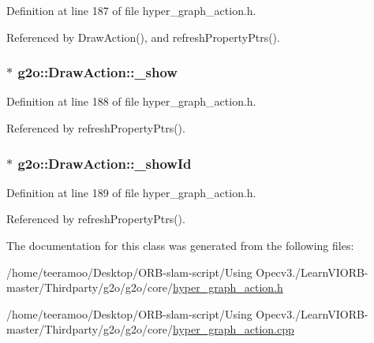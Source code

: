 Definition at line 187 of file hyper\+\_\+graph\+\_\+action.\+h.



Referenced by Draw\+Action(), and refresh\+Property\+Ptrs().

\subsubsection[{\texorpdfstring{\+\_\+show}{_show}}]{$\ast$ g2o\+::\+Draw\+Action\+::\+\_\+show\hspace{0.3cm}{\ttfamily [protected]}}\hypertarget{classg2o_1_1DrawAction_a1ec3a46473daeb8ac65e6a523a9248b6}{}\label{classg2o_1_1DrawAction_a1ec3a46473daeb8ac65e6a523a9248b6}


Definition at line 188 of file hyper\+\_\+graph\+\_\+action.\+h.



Referenced by refresh\+Property\+Ptrs().

\subsubsection[{\texorpdfstring{\+\_\+show\+Id}{_showId}}]{$\ast$ g2o\+::\+Draw\+Action\+::\+\_\+show\+Id\hspace{0.3cm}{\ttfamily [protected]}}\hypertarget{classg2o_1_1DrawAction_ab5f870bf2a931e64bc994c87c4212ad3}{}\label{classg2o_1_1DrawAction_ab5f870bf2a931e64bc994c87c4212ad3}


Definition at line 189 of file hyper\+\_\+graph\+\_\+action.\+h.



Referenced by refresh\+Property\+Ptrs().



The documentation for this class was generated from the following files\+:\begin{DoxyCompactItemize}
\item 
/home/teeramoo/\+Desktop/\+O\+R\+B-\/slam-\/script/\+Using Opecv3./\+Learn\+V\+I\+O\+R\+B-\/master/\+Thirdparty/g2o/g2o/core/\hyperlink{hyper__graph__action_8h}{hyper\+\_\+graph\+\_\+action.\+h}\item 
/home/teeramoo/\+Desktop/\+O\+R\+B-\/slam-\/script/\+Using Opecv3./\+Learn\+V\+I\+O\+R\+B-\/master/\+Thirdparty/g2o/g2o/core/\hyperlink{hyper__graph__action_8cpp}{hyper\+\_\+graph\+\_\+action.\+cpp}\end{DoxyCompactItemize}
